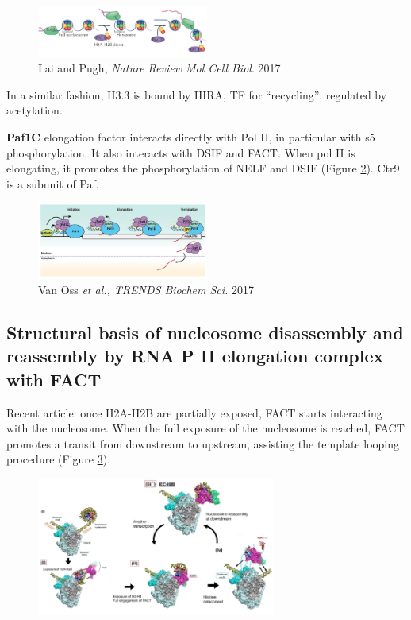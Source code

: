 \begin{figure}
\centering
\includegraphics[width=0.5\textwidth]{../_resources/Screenshot_2022-10-05_at_23-05-01.png}
\caption{Lai and Pugh, \emph{Nature Review Mol Cell Biol}. 2017}
\label{fig:FACT}
\end{figure}

In a similar fashion, H3.3 is bound by HIRA, TF for ``recycling'', regulated by acetylation.

\textbf{Paf1C} elongation factor interacts directly with Pol II, in particular with s5 phosphorylation. It also interacts with DSIF and FACT. When pol II is elongating, it promotes the phosphorylation of NELF and DSIF (Figure \ref{fig:el}). Ctr9 is a subunit of Paf.

\begin{figure}
\centering
\includegraphics[width=0.5\textwidth]{../_resources/Screenshot_2022-10-05_at_23-05-58.png}
\caption{Van Oss \emph{et al., TRENDS Biochem Sci.} 2017}
\label{fig:el}
\end{figure}


\hypertarget{structural-basis-of-nucleosome-disassembly-and-reassembly-by-rna-p-ii-elongation-complex-with-fact---ehara-et-al.}{%
\subsection{Structural basis of nucleosome disassembly and reassembly by RNA P II elongation complex with FACT}\label{structural-basis-of-nucleosome-disassembly-and-reassembly-by-rna-p-ii-elongation-complex-with-fact---ehara-et-al.}}

Recent article: once H2A-H2B are partially exposed, FACT starts interacting with the nucleosome. When the full exposure of the nucleosome is reached, FACT promotes a transit from downstream to upstream, assisting the template looping procedure (Figure \ref{fig:exp}).

\begin{figure}
\centering
\includegraphics[width=0.7\textwidth]{../_resources/Screenshot_2022-10-10_at_10-35-12.png}
\caption{}
\label{fig:exp}
\end{figure}

